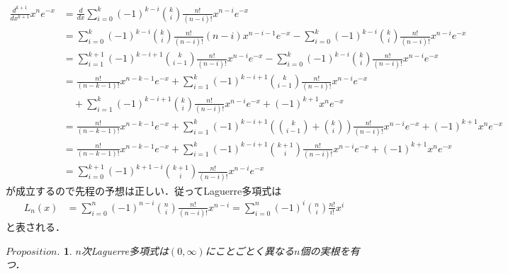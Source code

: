 \documentclass[a4j,papersize,disablejfam,slide,14pt]{jsarticle}
\newtheorem{Prop}{$Proposition.$}
\def\exp#1{e^{#1}} %
\begin{document}
    \begin{align}
    	\frac{d^{k+1}}{dx^{k+1}} x^n \exp{-x} &= \frac{d}{dx} \sum_{i=0}^{k} (-1)^{k-i} \binom{k}{i} \frac{n!}{(n-i)!} x^{n-i} \exp{-x} \\
        &= \sum_{i=0}^{k} (-1)^{k-i} \binom{k}{i} \frac{n!}{(n-i)!} (n-i) x^{n-i-1} \exp{-x} 
        	- \sum_{i=0}^{k} (-1)^{k-i} \binom{k}{i} \frac{n!}{(n-i)!} x^{n-i} \exp{-x} \\
        &= \sum_{i=1}^{k+1} (-1)^{k-i+1} \binom{k}{i-1} \frac{n!}{(n-i)!} x^{n-i} \exp{-x}
         	- \sum_{i=0}^{k} (-1)^{k-i} \binom{k}{i} \frac{n!}{(n-i)!} x^{n-i} \exp{-x} \\
        &= \frac{n!}{(n-k-1)!} x^{n-k-1} \exp{-x} + \sum_{i=1}^{k} (-1)^{k-i+1} \binom{k}{i-1} \frac{n!}{(n-i)!} x^{n-i} \exp{-x} \\
        	&\quad + \sum_{i=1}^{k} (-1)^{k-i+1} \binom{k}{i} \frac{n!}{(n-i)!} x^{n-i} \exp{-x} + (-1)^{k+1} x^n \exp{-x} \\
        &= \frac{n!}{(n-k-1)!} x^{n-k-1} \exp{-x} + \sum_{i=1}^{k} (-1)^{k-i+1} \left( \binom{k}{i-1} + \binom{k}{i} \right) \frac{n!}{(n-i)!} x^{n-i} \exp{-x} 
        	+ (-1)^{k+1} x^n \exp{-x} \\
        &= \frac{n!}{(n-k-1)!} x^{n-k-1} \exp{-x} + \sum_{i=1}^{k} (-1)^{k-i+1} \binom{k+1}{i} \frac{n!}{(n-i)!} x^{n-i} \exp{-x} 
        	+ (-1)^{k+1} x^n \exp{-x} \\
        &= \sum_{i=0}^{k+1} (-1)^{k+1-i} \binom{k+1}{i} \frac{n!}{(n-i)!} x^{n-i} \exp{-x}
    \end{align}
    が成立するので先程の予想は正しい．従って{\rm Laguerre}多項式は
    \begin{align}
    	L_n(x) &= \sum_{i=0}^{n} (-1)^{n-i} \binom{n}{i} \frac{n!}{(n-i)!} x^{n-i} = \sum_{i=0}^{n} (-1)^{i} \binom{n}{i} \frac{n!}{i!} x^i
    \end{align}
    と表される．
    \begin{screen}
            \begin{Prop}
                $n$次{\rm Laguerre}多項式は$(0, \infty)$にことごとく異なる$n$個の実根を有つ．
        \end{Prop}
    \end{screen}
\end{document}
